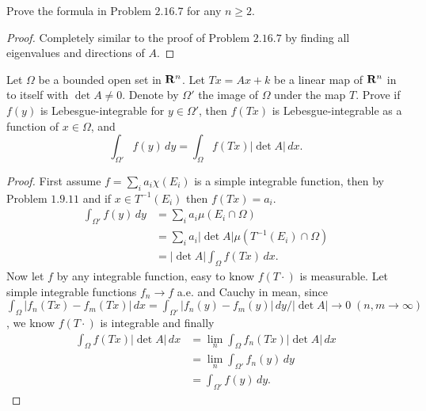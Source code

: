 \begin{pro}%
	Prove the formula in Problem $2.16.7$ for any $n\geq 2$.
\end{pro}
\begin{proof}
	Completely similar to the proof of Problem $2.16.7$ by finding all eigenvalues and directions of $A$.
\end{proof}

\begin{pro}%
	Let $\Omega$ be a bounded open set in $\mathbf{R}^n$. Let $Tx=Ax+k$ be a linear map of $\mathbf{R}^n$ in to itself with $\det A\neq 0$. Denote by $\Omega'$ the image of $\Omega$ under the map $T$. Prove if $f(y)$ is Lebesgue-integrable for $y\in\Omega'$, then $f(Tx)$ is Lebesgue-integrable as a function of $x\in\Omega$, and
	\[\int_{\Omega'} f(y)\,dy=\int_{\Omega} f(Tx)|\det A|\,dx.\]
\end{pro}
\begin{proof}
	First assume $f=\sum_i a_i\chi(E_i)$ is a simple integrable function, then by Problem $1.9.11$ and if $x\in T^{-1}(E_i)$ then $f(Tx)=a_i$.
	\begin{align*}
		\int_{\Omega'} f(y)\,dy&=\sum_i a_i\mu(E_i\cap \Omega)\\
							   &=\sum_i a_i|\det A|\mu(T^{-1}(E_i)\cap \Omega)\\
							   &=|\det A|\int_{\Omega} f(Tx)\,dx.
    \end{align*}
    Now let $f$ by any integrable function, easy to know $f(T\cdot)$ is measurable. Let simple integrable functions $f_n\to f$ a.e. and Cauchy in mean, since $\int_{\Omega}|f_n(Tx)-f_m(Tx)|\,dx=\int_{\Omega'}|f_n(y)-f_m(y)|\,dy/|\det A|\to 0\;(n,m\to\infty)$, we know $f(T\cdot)$ is integrable and finally
    \begin{align*}
    \int_{\Omega} f(Tx)|\det A|\,dx&=\lim_n \int_{\Omega}f_n(Tx)|\det A|\,dx\\
    &=\lim_n \int_{\Omega'} f_n(y)\,dy\\
    &=\int_{\Omega'} f(y)\,dy.
   	\end{align*}
\end{proof}